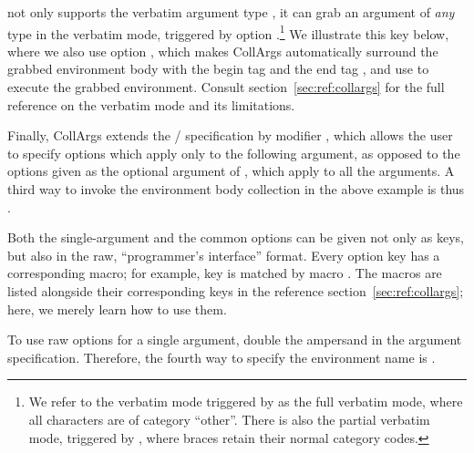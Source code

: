 \documentclass[a4paper,11pt]{article}
\begin{document}
 not only supports the verbatim argument
type , it can grab an argument of \emph{any} type in the
verbatim mode, triggered by option .\footnote{We refer to
  the verbatim mode triggered by  as the full verbatim
  mode, where all characters are of category ``other''.  There is also the
  partial verbatim mode, triggered by , where braces retain
  their normal category codes.} We illustrate this key below, where we also use
option , which makes CollArgs automatically surround the
grabbed environment body with the begin tag  and the end tag , and use
 to execute the grabbed environment.  Consult
section~\ref{sec:ref:collargs} for the full reference on the verbatim mode and
its limitations.


Finally, CollArgs extends the \slash{} specification
by modifier , which allows the user to specify options which
apply only to the following argument, as opposed to the options given as the
optional argument of , which apply to all the
arguments.  A third way to invoke the environment body collection in the above
example is thus %
.

Both the single-argument and the common options can be given not only as
 keys, but also in the raw, ``programmer's interface'' format.
Every option key has a corresponding macro; for example, key
 is matched by macro .
The macros are listed alongside their corresponding keys in the reference
section~\ref{sec:ref:collargs}; here, we merely learn how to use them.

To use raw options for a single argument, double the ampersand in the argument
specification.  Therefore, the fourth way to specify the environment name is
.
\end{document}
